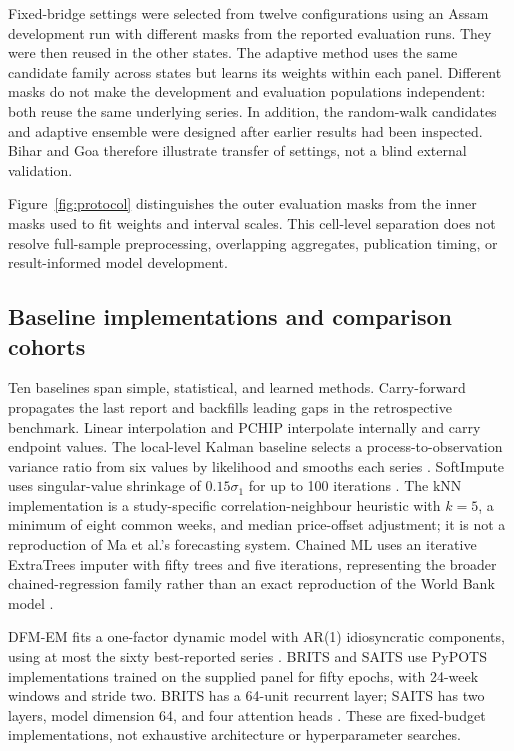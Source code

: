 \documentclass[sigconf,nonacm,balance=false]{acmart}
\begin{document}
Fixed-bridge settings were selected from twelve configurations using an Assam development run with different masks from the reported evaluation runs. They were then reused in the other states. The adaptive method uses the same candidate family across states but learns its weights within each panel. Different masks do not make the development and evaluation populations independent: both reuse the same underlying series. In addition, the random-walk candidates and adaptive ensemble were designed after earlier results had been inspected. Bihar and Goa therefore illustrate transfer of settings, not a blind external validation.

Figure~\ref{fig:protocol} distinguishes the outer evaluation masks from the inner masks used to fit weights and interval scales. This cell-level separation does not resolve full-sample preprocessing, overlapping aggregates, publication timing, or result-informed model development.


\subsection{Baseline implementations and comparison cohorts}

Ten baselines span simple, statistical, and learned methods. Carry-forward propagates the last report and backfills leading gaps in the retrospective benchmark. Linear interpolation and PCHIP interpolate internally and carry endpoint values. The local-level Kalman baseline selects a process-to-observation variance ratio from six values by likelihood and smooths each series \cite{moritz2017}. SoftImpute uses singular-value shrinkage of $0.15\sigma_1$ for up to 100 iterations \cite{mazumder2010}. The kNN implementation is a study-specific correlation-neighbour heuristic with $k=5$, a minimum of eight common weeks, and median price-offset adjustment; it is not a reproduction of Ma et al.'s forecasting system. Chained ML uses an iterative ExtraTrees imputer with fifty trees and five iterations, representing the broader chained-regression family rather than an exact reproduction of the World Bank model \cite{vanbuuren2011,stekhoven2012,andree2021}.

DFM-EM fits a one-factor dynamic model with AR(1) idiosyncratic components, using at most the sixty best-reported series \cite{banbura2014}. BRITS and SAITS use PyPOTS implementations trained on the supplied panel for fifty epochs, with 24-week windows and stride two. BRITS has a 64-unit recurrent layer; SAITS has two layers, model dimension 64, and four attention heads \cite{cao2018,du2023saits,du2023pypots}. These are fixed-budget implementations, not exhaustive architecture or hyperparameter searches.
\end{document}
